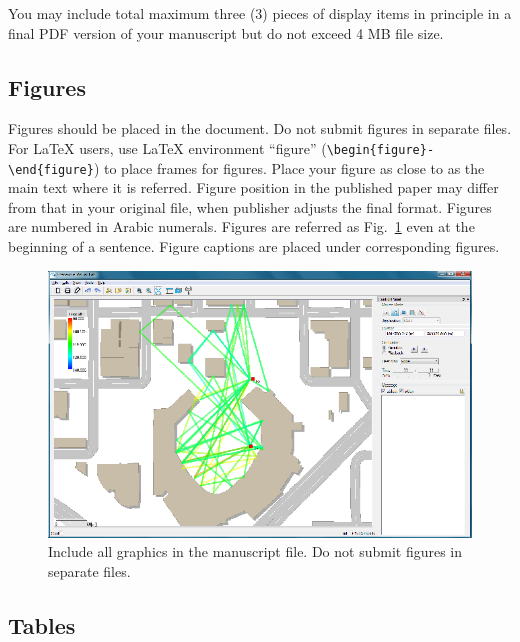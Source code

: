\documentclass{comex}
\begin{document}
You may include total maximum three (3) pieces of display items in
principle in a final PDF version of your manuscript but do not exceed 4 MB file size.



\subsection{Figures}

Figures should be placed in the document.  Do not submit figures in
separate files.  For \LaTeX{} users, use \LaTeX{} environment ``figure'' (\verb+\begin{figure}-+\linebreak
\verb+\end{figure}+) to
place frames for figures. Place your figure as close to as the main text
where it is referred.  Figure position in the published paper may differ
from that in your original file, when publisher adjusts the final
format. Figures are numbered in Arabic numerals. Figures are referred as
Fig.~\ref{fig:scanner} even at the beginning of a sentence. Figure
captions are placed under corresponding figures.

\begin{figure}[htb]
\begin{center}
\includegraphics{f01.eps}
\end{center}
\caption{Include all graphics in the manuscript file. Do not submit
figures in separate files.}  \label{fig:scanner}
\end{figure}

\subsection{Tables}
\end{document}
